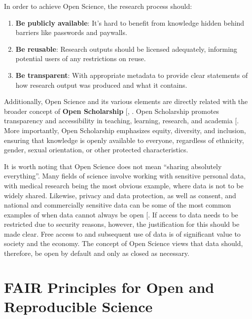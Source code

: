 \documentclass[
  11pt,
  letterpaper,
]{scrreprt}
\begin{document}
In order to achieve Open Science, the research process should:

\begin{enumerate}
\def\labelenumi{\arabic{enumi}.}
\item
  \textbf{Be publicly available}: It's hard to benefit from knowledge
  hidden behind barriers like passwords and paywalls.
\item
  \textbf{Be reusable}: Research outputs should be licensed adequately,
  informing potential users of any restrictions on reuse.
\item
  \textbf{Be transparent}: With appropriate metadata to provide clear
  statements of how research output was produced and what it contains.
\end{enumerate}

Additionally, Open Science and its various elements are directly related
with the broader concept of \textbf{Open Scholarship}
{[},
\citeproc{ref-tennant2019Foundations}{368}{]}. Open Scholarship promotes
transparency and accessibility in teaching, learning, research, and
academia {[}\citeproc{ref-emeryLibGuides}{369}{]}. More importantly,
Open Scholarship emphasizes equity, diversity, and inclusion, ensuring
that knowledge is openly available to everyone, regardless of ethnicity,
gender, sexual orientation, or other protected characteristics.

It is worth noting that Open Science does not mean ``sharing absolutely
everything''. Many fields of science involve working with sensitive
personal data, with medical research being the most obvious example,
where data is not to be widely shared. Likewise, privacy and data
protection, as well as consent, and national and commercially sensitive
data can be some of the most common examples of when data cannot always
be open {[}\citeproc{ref-regulation2016RegulationEU2016}{370}{]}. If
access to data needs to be restricted due to security reasons, however,
the justification for this should be made clear. Free access to and
subsequent use of data is of significant value to society and the
economy. The concept of Open Science views that data should, therefore,
be open by default and only as closed as necessary.

\section{FAIR Principles for Open and Reproducible
Science}\label{fair-principles-for-open-and-reproducible-science}
\end{document}
